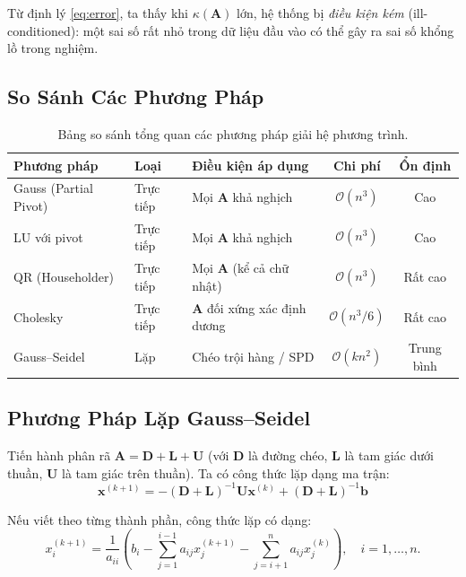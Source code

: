 \documentclass[a4paper,12pt]{report}
\begin{document}
Từ định lý \ref{eq:error}, ta thấy khi $\kappa(\mathbf{A})$ lớn, hệ thống bị \textit{điều kiện kém} (ill-conditioned): một sai số rất nhỏ trong dữ liệu đầu vào có thể gây ra sai số khổng lồ trong nghiệm.

\subsection{So Sánh Các Phương Pháp}

\begin{table}[h!]
\centering
\begin{tabular}{lllcc}
\toprule
\textbf{Phương pháp} & \textbf{Loại} & \textbf{Điều kiện áp dụng} & \textbf{Chi phí} & \textbf{Ổn định} \\
\midrule
Gauss (Partial Pivot) & Trực tiếp & Mọi $\mathbf{A}$ khả nghịch & $\mathcal{O}(n^3)$ & Cao \\
LU với pivot & Trực tiếp & Mọi $\mathbf{A}$ khả nghịch & $\mathcal{O}(n^3)$ & Cao \\
QR (Householder) & Trực tiếp & Mọi $\mathbf{A}$ (kể cả chữ nhật) & $\mathcal{O}(n^3)$ & Rất cao \\
Cholesky & Trực tiếp & $\mathbf{A}$ đối xứng xác định dương & $\mathcal{O}(n^3/6)$ & Rất cao \\
Gauss–Seidel & Lặp & Chéo trội hàng / SPD & $\mathcal{O}(kn^2)$ & Trung bình \\
\bottomrule
\end{tabular}
\caption{Bảng so sánh tổng quan các phương pháp giải hệ phương trình.}
\end{table}
\newpage
\subsection{Phương Pháp Lặp Gauss–Seidel}
Tiến hành phân rã $\mathbf{A} = \mathbf{D} + \mathbf{L} + \mathbf{U}$ (với $\mathbf{D}$ là đường chéo, $\mathbf{L}$ là tam giác dưới thuần, $\mathbf{U}$ là tam giác trên thuần). Ta có công thức lặp dạng ma trận:
\begin{equation}
    \mathbf{x}^{(k+1)} = -(\mathbf{D} + \mathbf{L})^{-1}\mathbf{U}\mathbf{x}^{(k)} + (\mathbf{D} + \mathbf{L})^{-1}\mathbf{b}
\end{equation}

Nếu viết theo từng thành phần, công thức lặp có dạng:
\begin{equation}
    x_i^{(k+1)} = \frac{1}{a_{ii}} \left( b_i - \sum_{j=1}^{i-1} a_{ij} x_j^{(k+1)} - \sum_{j=i+1}^n a_{ij} x_j^{(k)} \right), \quad i = 1, \dots, n.
\end{equation}
\end{document}
